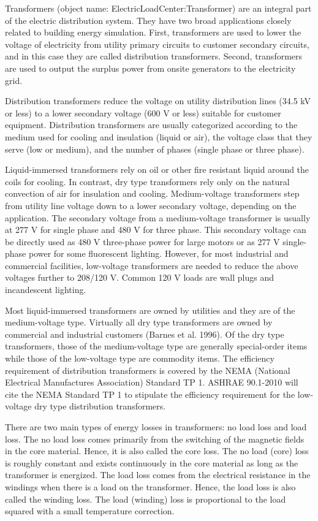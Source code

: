 Transformers (object name: ElectricLoadCenter:Transformer) are an integral part of the electric distribution system. They have two broad applications closely related to building energy simulation. First, transformers are used to lower the voltage of electricity from utility primary circuits to customer secondary circuits, and in this case they are called distribution transformers. Second, transformers are used to output the surplus power from onsite generators to the electricity grid.

Distribution transformers reduce the voltage on utility distribution lines (34.5 kV or less) to a lower secondary voltage (600 V or less) suitable for customer equipment. Distribution transformers are usually categorized according to the medium used for cooling and insulation (liquid or air), the voltage class that they serve (low or medium), and the number of phases (single phase or three phase).

Liquid-immersed transformers rely on oil or other fire resistant liquid around the coils for cooling. In contrast, dry type transformers rely only on the natural convection of air for insulation and cooling. Medium-voltage transformers step from utility line voltage down to a lower secondary voltage, depending on the application. The secondary voltage from a medium-voltage transformer is usually at 277 V for single phase and 480 V for three phase. This secondary voltage can be directly used as 480 V three-phase power for large motors or as 277 V single-phase power for some fluorescent lighting. However, for most industrial and commercial facilities, low-voltage transformers are needed to reduce the above voltages further to 208/120 V. Common 120 V loads are wall plugs and incandescent lighting.

Most liquid-immersed transformers are owned by utilities and they are of the medium-voltage type. Virtually all dry type transformers are owned by commercial and industrial customers (Barnes et al. 1996). Of the dry type transformers, those of the medium-voltage type are generally special-order items while those of the low-voltage type are commodity items. The efficiency requirement of distribution transformers is covered by the NEMA (National Electrical Manufactures Association) Standard TP 1. ASHRAE 90.1-2010 will cite the NEMA Standard TP 1 to stipulate the efficiency requirement for the low-voltage dry type distribution transformers.

There are two main types of energy losses in transformers: no load loss and load loss. The no load loss comes primarily from the switching of the magnetic fields in the core material. Hence, it is also called the core loss. The no load (core) loss is roughly constant and exists continuously in the core material as long as the transformer is energized. The load loss comes from the electrical resistance in the windings when there is a load on the transformer. Hence, the load loss is also called the winding loss. The load (winding) loss is proportional to the load squared with a small temperature correction.

